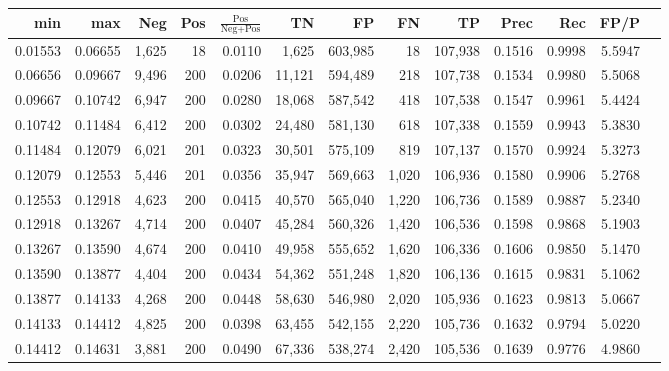 \begin{tabular}{rrrrrrrrrrrrr}
\toprule
    min &     max &   Neg & Pos & $\frac{\text{Pos}}{\text{Neg}+\text{Pos}}$ &      TN &      FP &      FN &      TP &   Prec &    Rec &   FP/P \\
\midrule
0.01553 & 0.06655 & 1,625 &  18 &                                     0.0110 &   1,625 & 603,985 &      18 & 107,938 & 0.1516 & 0.9998 & 5.5947 \\
0.06656 & 0.09667 & 9,496 & 200 &                                     0.0206 &  11,121 & 594,489 &     218 & 107,738 & 0.1534 & 0.9980 & 5.5068 \\
0.09667 & 0.10742 & 6,947 & 200 &                                     0.0280 &  18,068 & 587,542 &     418 & 107,538 & 0.1547 & 0.9961 & 5.4424 \\
0.10742 & 0.11484 & 6,412 & 200 &                                     0.0302 &  24,480 & 581,130 &     618 & 107,338 & 0.1559 & 0.9943 & 5.3830 \\
0.11484 & 0.12079 & 6,021 & 201 &                                     0.0323 &  30,501 & 575,109 &     819 & 107,137 & 0.1570 & 0.9924 & 5.3273 \\
0.12079 & 0.12553 & 5,446 & 201 &                                     0.0356 &  35,947 & 569,663 &   1,020 & 106,936 & 0.1580 & 0.9906 & 5.2768 \\
0.12553 & 0.12918 & 4,623 & 200 &                                     0.0415 &  40,570 & 565,040 &   1,220 & 106,736 & 0.1589 & 0.9887 & 5.2340 \\
0.12918 & 0.13267 & 4,714 & 200 &                                     0.0407 &  45,284 & 560,326 &   1,420 & 106,536 & 0.1598 & 0.9868 & 5.1903 \\
0.13267 & 0.13590 & 4,674 & 200 &                                     0.0410 &  49,958 & 555,652 &   1,620 & 106,336 & 0.1606 & 0.9850 & 5.1470 \\
0.13590 & 0.13877 & 4,404 & 200 &                                     0.0434 &  54,362 & 551,248 &   1,820 & 106,136 & 0.1615 & 0.9831 & 5.1062 \\
0.13877 & 0.14133 & 4,268 & 200 &                                     0.0448 &  58,630 & 546,980 &   2,020 & 105,936 & 0.1623 & 0.9813 & 5.0667 \\
0.14133 & 0.14412 & 4,825 & 200 &                                     0.0398 &  63,455 & 542,155 &   2,220 & 105,736 & 0.1632 & 0.9794 & 5.0220 \\
0.14412 & 0.14631 & 3,881 & 200 &                                     0.0490 &  67,336 & 538,274 &   2,420 & 105,536 & 0.1639 & 0.9776 & 4.9860 \\

\end{tabular}
